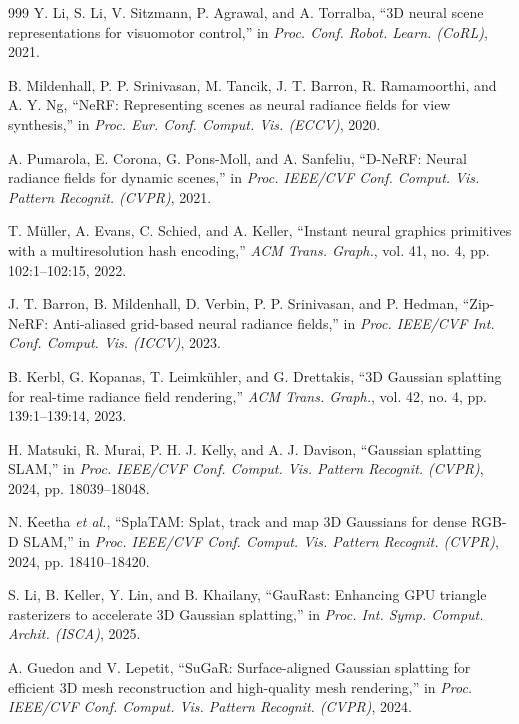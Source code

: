 ﻿\documentclass[11pt,a4paper]{article}
\begin{document}
\begin{thebibliography}{999}
Y. Li, S. Li, V. Sitzmann, P. Agrawal, and A. Torralba, ``{3D} neural scene representations for visuomotor control,'' in \textit{Proc. Conf. Robot. Learn. (CoRL)}, 2021.

B. Mildenhall, P. P. Srinivasan, M. Tancik, J. T. Barron, R. Ramamoorthi, and A. Y. Ng, ``NeRF: Representing scenes as neural radiance fields for view synthesis,'' in \textit{Proc. Eur. Conf. Comput. Vis. (ECCV)}, 2020.

A. Pumarola, E. Corona, G. Pons-Moll, and A. Sanfeliu, ``D-NeRF: Neural radiance fields for dynamic scenes,'' in \textit{Proc. IEEE/CVF Conf. Comput. Vis. Pattern Recognit. (CVPR)}, 2021.

T. M\"uller, A. Evans, C. Schied, and A. Keller, ``Instant neural graphics primitives with a multiresolution hash encoding,'' \textit{ACM Trans. Graph.}, vol. 41, no. 4, pp. 102:1--102:15, 2022.

J. T. Barron, B. Mildenhall, D. Verbin, P. P. Srinivasan, and P. Hedman, ``Zip-NeRF: Anti-aliased grid-based neural radiance fields,'' in \textit{Proc. IEEE/CVF Int. Conf. Comput. Vis. (ICCV)}, 2023.


B. Kerbl, G. Kopanas, T. Leimk\"{u}hler, and G. Drettakis, ``{3D} Gaussian splatting for real-time radiance field rendering,'' \textit{ACM Trans. Graph.}, vol. 42, no. 4, pp. 139:1--139:14, 2023.

H. Matsuki, R. Murai, P. H. J. Kelly, and A. J. Davison, ``Gaussian splatting {SLAM},'' in \textit{Proc. IEEE/CVF Conf. Comput. Vis. Pattern Recognit. (CVPR)}, 2024, pp. 18039--18048.

N. Keetha \textit{et al.}, ``{SplaTAM}: Splat, track and map {3D} Gaussians for dense {RGB-D SLAM},'' in \textit{Proc. IEEE/CVF Conf. Comput. Vis. Pattern Recognit. (CVPR)}, 2024, pp. 18410--18420.

S. Li, B. Keller, Y. Lin, and B. Khailany, ``{GauRast}: Enhancing {GPU} triangle rasterizers to accelerate {3D} Gaussian splatting,'' in \textit{Proc. Int. Symp. Comput. Archit. (ISCA)}, 2025.

A. Guedon and V. Lepetit, ``{SuGaR}: Surface-aligned {Gaussian} splatting for efficient {3D} mesh reconstruction and high-quality mesh rendering,'' in \textit{Proc. IEEE/CVF Conf. Comput. Vis. Pattern Recognit. (CVPR)}, 2024.


\end{thebibliography}
\end{document}
